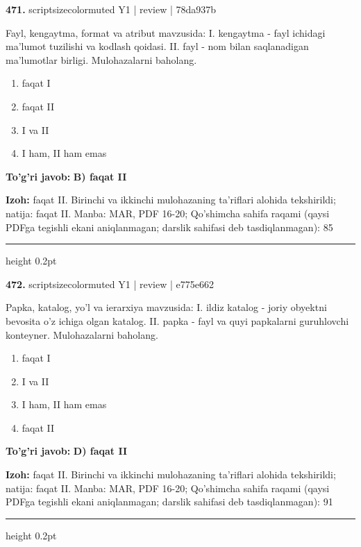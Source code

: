 \documentclass[10pt,a4paper]{article}
\begin{document}
{\bfseries\sffamily\color{ink} 471.} {scriptsizecolor{muted} Y1 | review | 78da937b}
\par
Fayl, kengaytma, format va atribut mavzusida: I. kengaytma - fayl ichidagi ma'lumot tuzilishi va kodlash qoidasi. II. fayl - nom bilan saqlanadigan ma'lumotlar birligi. Mulohazalarni baholang.
\begin{enumerate}[label=\Alph*),leftmargin=9mm]
\item faqat I
\item faqat II
\item I va II
\item I ham, II ham emas
\end{enumerate}
\begin{tcolorbox}[enhanced,breakable,colback=teal!4,colframe=teal!60!black,boxrule=0.45pt,arc=1.2mm,left=2.7mm,right=2.7mm,top=1.8mm,bottom=1.8mm,before skip=2mm,after skip=2mm]
{\bfseries\sffamily\color{teal}To'g'ri javob:} \textbf{B) faqat II}
\par\smallskip
{\bfseries Izoh:} faqat II. Birinchi va ikkinchi mulohazaning ta'riflari alohida tekshirildi; natija: faqat II. Manba: MAR, PDF 16-20; Qo'shimcha sahifa raqami (qaysi PDFga tegishli ekani aniqlanmagan; darslik sahifasi deb tasdiqlanmagan): 85
\end{tcolorbox}
\vspace{2mm}\hrule height 0.2pt\vspace{3mm}

{\bfseries\sffamily\color{ink} 472.} {scriptsizecolor{muted} Y1 | review | e775e662}
\par
Papka, katalog, yo'l va ierarxiya mavzusida: I. ildiz katalog - joriy obyektni bevosita o'z ichiga olgan katalog. II. papka - fayl va quyi papkalarni guruhlovchi konteyner. Mulohazalarni baholang.
\begin{enumerate}[label=\Alph*),leftmargin=9mm]
\item faqat I
\item I va II
\item I ham, II ham emas
\item faqat II
\end{enumerate}
\begin{tcolorbox}[enhanced,breakable,colback=teal!4,colframe=teal!60!black,boxrule=0.45pt,arc=1.2mm,left=2.7mm,right=2.7mm,top=1.8mm,bottom=1.8mm,before skip=2mm,after skip=2mm]
{\bfseries\sffamily\color{teal}To'g'ri javob:} \textbf{D) faqat II}
\par\smallskip
{\bfseries Izoh:} faqat II. Birinchi va ikkinchi mulohazaning ta'riflari alohida tekshirildi; natija: faqat II. Manba: MAR, PDF 16-20; Qo'shimcha sahifa raqami (qaysi PDFga tegishli ekani aniqlanmagan; darslik sahifasi deb tasdiqlanmagan): 91
\end{tcolorbox}
\vspace{2mm}\hrule height 0.2pt\vspace{3mm}
\clearpage
\end{document}

